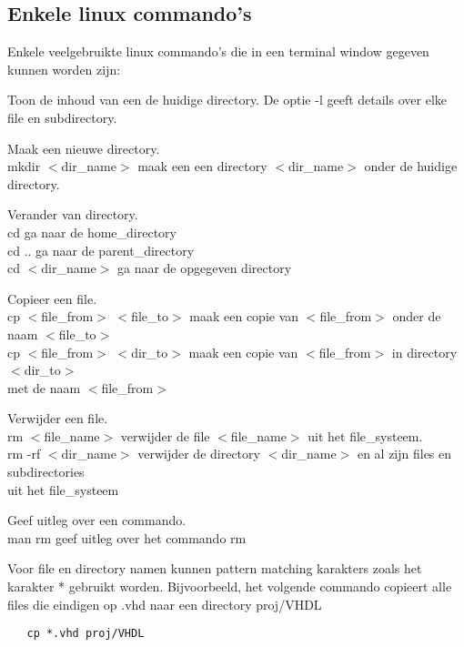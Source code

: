 \subsection{Enkele linux commando's}
Enkele veelgebruikte linux commando's die in een terminal window gegeven kunnen worden zijn:
\begin{description}
\setlength{\itemsep}{0cm}
\item[ls]    
Toon de inhoud van een de huidige directory.
De optie -l geeft details over elke file en subdirectory.
\item[mkdir]   
Maak een nieuwe directory. \\
mkdir $<$dir\_name$>$ \hspace*{0.5cm}maak een een directory $<$dir\_name$>$ onder de huidige directory.
\item[cd]
Verander van directory. \\
cd \hspace*{3.2cm}ga naar de home\_directory \\
cd .. \hspace*{2.8cm}         ga naar de parent\_directory \\
cd $<$dir\_name$>$ \hspace*{1.0cm} ga naar de opgegeven directory 
\item[cp]    
Copieer een file. \\
cp $<$file\_from$>$ $<$file\_to$>$ \hspace*{0.5cm}maak een copie van $<$file\_from$>$ onder de naam $<$file\_to$>$ \\
cp $<$file\_from$>$ $<$dir\_to$>$ \hspace*{0.58cm}maak een copie van $<$file\_from$>$ in directory $<$dir\_to$>$ \\
\hspace*{4.7cm}met de naam $<$file\_from$>$ 
\item[rm]   
Verwijder een file. \\
rm $<$file\_name$>$ \hspace*{1.2cm} verwijder de file $<$file\_name$>$ uit het file\_systeem. \\
rm -rf $<$dir\_name$>$ \hspace*{0.8cm} verwijder de directory $<$dir\_name$>$ en al zijn files en subdirectories \\
\hspace*{4cm}uit het file\_systeem
\item[man]    
Geef uitleg over een commando. \\
man rm \hspace*{2.6cm} geef uitleg over het commando rm
\end{description}
Voor file en directory namen kunnen pattern matching karakters zoals het
karakter * gebruikt worden.
Bijvoorbeeld, het volgende commando copieert alle files die eindigen op .vhd naar 
een directory proj/VHDL
\begin{verbatim}
   cp *.vhd proj/VHDL
\end{verbatim}
\cleardoublepage
